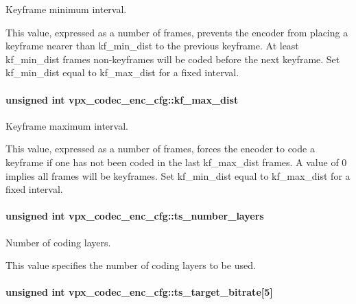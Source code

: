 \-Keyframe minimum interval. 

\-This value, expressed as a number of frames, prevents the encoder from placing a keyframe nearer than kf\-\_\-min\-\_\-dist to the previous keyframe. \-At least kf\-\_\-min\-\_\-dist frames non-\/keyframes will be coded before the next keyframe. \-Set kf\-\_\-min\-\_\-dist equal to kf\-\_\-max\-\_\-dist for a fixed interval. \hypertarget{structvpx__codec__enc__cfg_ae018440136e271743376730413d25a9b}{
\paragraph[{kf\-\_\-max\-\_\-dist}]{\setlength{\rightskip}{0pt plus 5cm}unsigned int {\bf vpx\-\_\-codec\-\_\-enc\-\_\-cfg\-::kf\-\_\-max\-\_\-dist}}}
\label{structvpx__codec__enc__cfg_ae018440136e271743376730413d25a9b}


\-Keyframe maximum interval. 

\-This value, expressed as a number of frames, forces the encoder to code a keyframe if one has not been coded in the last kf\-\_\-max\-\_\-dist frames. \-A value of 0 implies all frames will be keyframes. \-Set kf\-\_\-min\-\_\-dist equal to kf\-\_\-max\-\_\-dist for a fixed interval. \hypertarget{structvpx__codec__enc__cfg_a16d4549a30cbd585e3c3056ef873d8c7}{
\paragraph[{ts\-\_\-number\-\_\-layers}]{\setlength{\rightskip}{0pt plus 5cm}unsigned int {\bf vpx\-\_\-codec\-\_\-enc\-\_\-cfg\-::ts\-\_\-number\-\_\-layers}}}
\label{structvpx__codec__enc__cfg_a16d4549a30cbd585e3c3056ef873d8c7}


\-Number of coding layers. 

\-This value specifies the number of coding layers to be used. \hypertarget{structvpx__codec__enc__cfg_aba7ceb7a90500a8f76aff89575737f3a}{
\paragraph[{ts\-\_\-target\-\_\-bitrate}]{\setlength{\rightskip}{0pt plus 5cm}unsigned int {\bf vpx\-\_\-codec\-\_\-enc\-\_\-cfg\-::ts\-\_\-target\-\_\-bitrate}\mbox{[}5\mbox{]}}}
\label{structvpx__codec__enc__cfg_aba7ceb7a90500a8f76aff89575737f3a}


